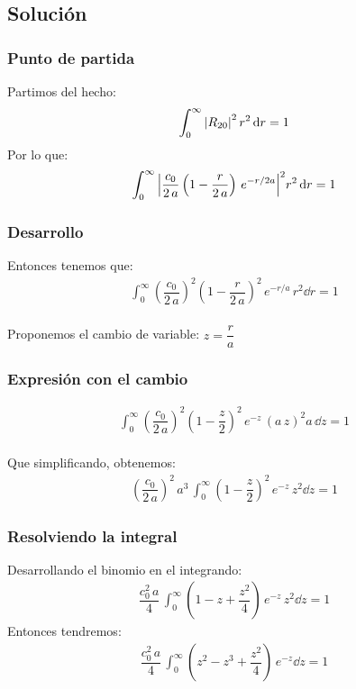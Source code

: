 \documentclass[12pt]{beamer}
\begin{document}
\subsection{Solución}
\begin{frame}
\frametitle{Punto de partida}
Partimos del hecho:
\begin{align*}
\int_{0}^{\infty} \abs{R_{20}}^{2} \, r^{2} \dd{r} = 1
\end{align*}
\pause
Por lo que:
\begin{align*}
\int_{0}^{\infty} \abs{ \dfrac{c_{0}}{2 \, a} \left( 1 - \dfrac{r}{2 \, a} \right) \, e^{-r/2a} }^{2} r^{2} \dd{r} = 1
\end{align*}
\end{frame}
\begin{frame}
\frametitle{Desarrollo}
Entonces tenemos que:
\begin{align*}
\int_{0}^{\infty} \left(\dfrac{c_{0}}{2 \, a}\right)^{2} \left( 1 - \dfrac{r}{2 \, a} \right)^{2} \, e^{-r/a} \, r^{2} \dd{r} = 1
\end{align*}
\\
\bigskip
\pause
Proponemos el cambio de variable: $z = \dfrac{r}{a}$
\end{frame}
\begin{frame}
\frametitle{Expresión con el cambio}
\begin{align*}
\int_{0}^{\infty} \left(\dfrac{c_{0}}{2 \, a}\right)^{2} \left( 1 - \dfrac{z}{2} \right)^{2} \, e^{-z} \, (a \, z)^{2} a \, \dd{z} = 1
\end{align*}
\\
\bigskip
\pause
Que simplificando, obtenemos:
\begin{align*}
\left(\dfrac{c_{0}}{2 \, a}\right)^{2} \, a^{3} \, \int_{0}^{\infty} \left( 1 - \dfrac{z}{2} \right)^{2} \, e^{-z} \, z^{2} \dd{z} = 1
\end{align*}
\end{frame}
\begin{frame}
\frametitle{Resolviendo la integral}
Desarrollando el binomio en el integrando:
\begin{align*}
\dfrac{c_{0}^{2} \, a}{4} \, \int_{0}^{\infty} \left( 1 - z + \dfrac{z^{2}}{4} \right) \, e^{-z} \, z^{2} \dd{z} = 1
\end{align*}
\pause
Entonces tendremos:
\begin{align*}
\dfrac{c_{0}^{2} \, a}{4} \, \int_{0}^{\infty} \left( z^{2} - z^{3} + \dfrac{z^{2}}{4} \right) \, e^{-z} \dd{z} = 1
\end{align*}
\end{frame}
\end{document}
